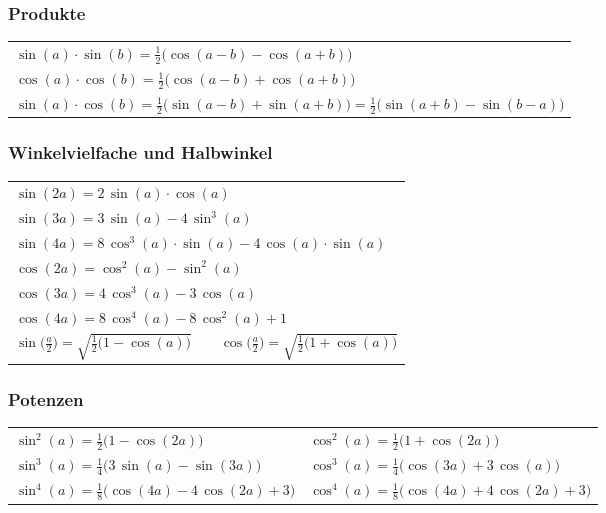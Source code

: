 \subsubsection{Produkte}

\renewcommand{\arraystretch}{1.2}
\begin{tabular}{l}
    $\sin(a) \cdot \sin(b) = \frac{1}{2} \big( \cos(a-b) - \cos(a+b) \big) $ \\
    $\cos(a) \cdot \cos(b) = \frac{1}{2} \big( \cos(a-b) + \cos(a+b) \big) $ \\
    $\sin(a) \cdot \cos(b) = \frac{1}{2} \big( \sin(a-b) + \sin(a+b) \big) = \frac{1}{2} \big( \sin(a+b) - \sin(b-a) \big) $
\end{tabular}
\renewcommand{\arraystretch}{1}


\subsubsection{Winkelvielfache und Halbwinkel}

\renewcommand{\arraystretch}{1.2}
\begin{tabular}{l}
    $\sin(2a) = 2 \, \sin(a) \cdot \cos(a)$
    \\
    $\sin(3a) = 3 \, \sin(a) -4 \, \sin^3(a)$                              \\ \medskip
    $\sin(4a) = 8 \, \cos^3(a) \cdot \sin(a) - 4 \, \cos(a) \cdot \sin(a)$ \\
    $\cos(2a) = \cos^2(a) - \sin^2(a)$
    \\
    $\cos(3a) = 4 \, \cos^3(a) -3 \, \cos(a)$                              \\  \medskip
    $\cos(4a) = 8 \, \cos^4(a) - 8 \, \cos^2(a) + 1$
    \\
    $\sin \Big( \frac{a}{2} \Big) = \sqrt{\frac{1}{2} \big(1-\cos(a) \big)} \qquad \cos \Big( \frac{a}{2} \Big) = \sqrt{\frac{1}{2} \big(1+\cos(a) \big)}$
\end{tabular}
\renewcommand{\arraystretch}{1}


\subsubsection{Potenzen}

\renewcommand{\arraystretch}{1.2}
\begin{tabular}{ll}
    $\sin^2(a) = \frac{1}{2} \big(1-\cos(2a) \big)$                 & $\cos^2(a) = \frac{1}{2} \big(1+\cos(2a) \big)$                  \\
    $\sin^3(a) = \frac{1}{4} \big(3\, \sin(a) - \sin(3a) \big)$     & $\cos^3(a) = \frac{1}{4} \big(\cos(3a) + 3 \, \cos(a) \big)$     \\
    $\sin^4(a) = \frac{1}{8} \big(\cos(4a) -4 \, \cos(2a) +3 \big)$ & $\cos^4(a) = \frac{1}{8} \big(\cos(4a) + 4 \, \cos(2a) +3 \big)$
\end{tabular}
\renewcommand{\arraystretch}{1}

